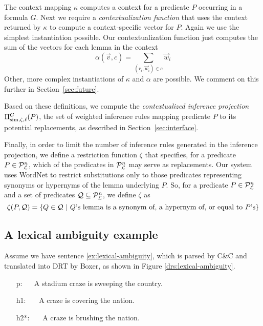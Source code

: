 The context mapping $\kappa$ computes a context for a predicate $P$
occurring in a formula $G$. Next we require a 
\textit{contextualization function} that uses the context returned by
$\kappa$ to compute a context-specific vector for $P$. Again we use
the simplest instantiation possible. Our contextualization
function just computes the sum of the vectors for each lemma in the context \[ \alpha(\vec v,
c) = \sum_{(r_i, \vec w_i) \in c} \vec w_i \]  Other, more complex
instantiations of $\kappa$ and $\alpha$ are possible. We comment on
this further in Section~\ref{sec:future}. 

Based on these definitions, we compute the \textit{contextualized
inference projection} $\Pi^G_{\mathrm{sim},\zeta,\ell}(P)$, the set of weighted
inference rules mapping predicate $P$ to its potential replacements,
as described in Section~\ref{sec:interface}.

Finally, in order to limit the number of inference rules generated in the
inference projection, we define a restriction function $\zeta$ that specifies,
for a predicate $P \in {\cal{P}}_{{\cal{L}}}^n$, which of the predicates in
${\cal{P}}_{{\cal{L}}}^n$ may serve as replacements.  Our system uses WordNet
\citep{miller:wordnet2009} to restrict substitutions only to those predicates
representing synonyms or hypernyms of the lemma underlying $P$.  So, for a
predicate $P \in {\cal{P}}_{{\cal{L}}}^n$ and a set of predicates ${\cal Q}
\subseteq {\cal{P}}_{{\cal{L}}}^n$, we define $\zeta$ as \[ \zeta(P,{\cal Q}) = \{
Q \in {\cal Q} ~|~ Q\text{'s lemma is a synonym of, a hypernym of, or equal to
}P\text{'s} \} \]


\subsection*{A lexical ambiguity example}

Assume we have sentence \eqref{ex:lexical-ambiguity}, which is parsed by C\&C
and translated into DRT by Boxer, as shown in Figure
\ref{drs:lexical-ambiguity}.

\begin{covex}\label{ex:lexical-ambiguity}
\begin{itemize} \itemsep -3pt
  \item[p:]~~  A stadium craze is sweeping the country.
  \item[h1:]~~~A craze is covering the nation.
  \item[h2*:]~~~A craze is brushing the nation.
\end{itemize}
\end{covex}

